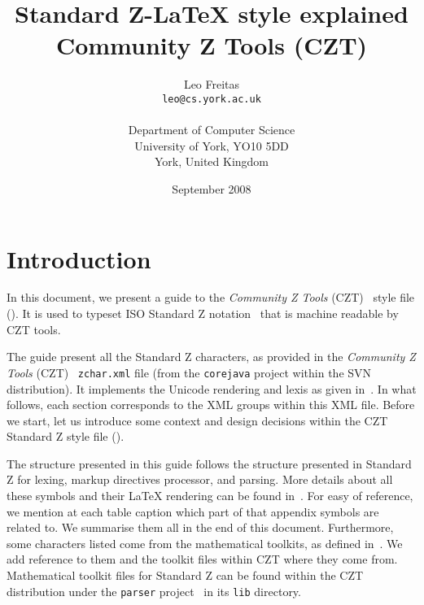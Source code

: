 \documentclass{article}
\newcommand{\emfile}[1]{\texttt{#1}}%
\begin{document}
\title{Standard Z-\LaTeX{} style explained\\ Community Z Tools (CZT)}
\author{Leo Freitas \\ \texttt{leo@cs.york.ac.uk} \\ \\ Department of Computer Science \\ University of York, YO10 5DD \\ York, United Kingdom \\ }
\date{September 2008}
\maketitle

\tableofcontents
\listoftables

\section{Introduction}\label{sec:intro}

In this document, we present a guide to the \textit{Community Z Tools} (CZT)~\cite{czt}
style file (\cztstylefile). It is used to typeset ISO Standard Z notation~\cite{isoz} that is
machine readable by CZT tools.

The guide present all the Standard Z characters, as provided in
the \textit{Community Z Tools} (CZT)~\cite{czt} \emfile{zchar.xml} file (from
the \texttt{corejava} project within the SVN distribution). It implements the Unicode
rendering and lexis as given in~\cite[Ch.~6--7]{isoz}. In what follows, each
section corresponds to the XML groups within this XML file. Before we start, let us
introduce some context and design decisions within the CZT Standard Z style file (\cztstylefile).

The structure presented in this guide follows the structure presented in Standard Z for
lexing, markup directives processor, and parsing. More details about all these symbols
and their \LaTeX{} rendering can be found in~\cite[Appendix~A]{isoz}. For easy of
reference, we mention at each table caption which part of that appendix symbols are related to.
We summarise them all in the end of this document.
Furthermore, some characters listed come from the mathematical toolkits, as defined
in~\cite[Appendix~B]{isoz}. We add reference to them and the toolkit files
within CZT where they come from. Mathematical toolkit files for Standard Z can
be found within the CZT distribution under the \texttt{parser} project~\cite{czt} in
its \texttt{lib} directory.
\end{document}
